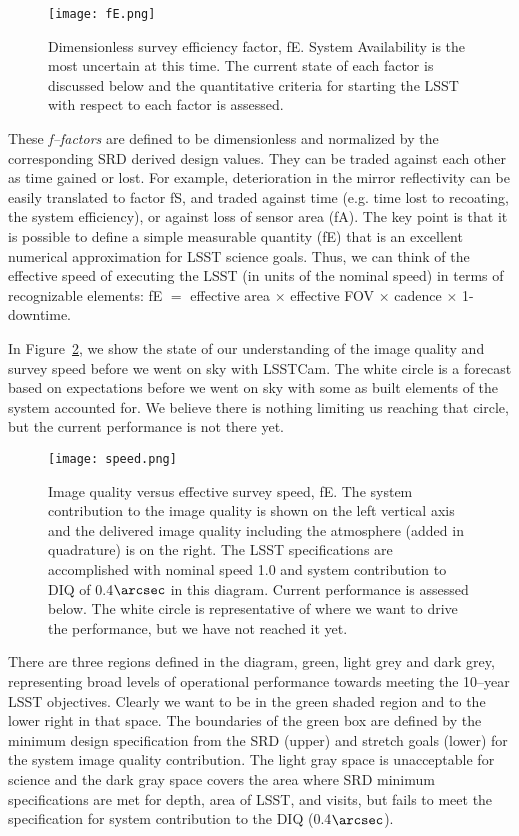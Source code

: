 \begin{figure}%
\centering
\texttt{[image: fE.png]}
\caption{Dimensionless survey efficiency factor, fE. System Availability is the most uncertain at this time. The current state of each factor is discussed below and the quantitative criteria for starting the LSST with respect to each factor is assessed.}
\label{fE}
\end{figure}

These {\it f--factors} are defined to be dimensionless and normalized by the corresponding SRD derived design values. They can be traded against each other as time gained or lost.  For example, deterioration in the mirror reflectivity can be easily translated to factor fS, and traded against time (e.g. time lost to recoating, the system efficiency), or against loss of sensor area (fA).
The key point is that it is possible to define a simple measurable quantity (fE) that is an excellent numerical approximation for LSST science goals. Thus, we can think of the effective speed of executing the LSST (in units of the nominal speed) in terms of recognizable elements:  fE $=$ effective area $\times$ effective FOV $\times$ cadence $\times$ 1-downtime.

In Figure~\ref{speed}, we show the state of our understanding of the image quality and survey speed before we went on sky with LSSTCam. The white circle is a forecast based on expectations before we went on sky with some as built elements of the system accounted for. We believe there is nothing limiting us reaching that circle, but the current performance is not there yet. 

\begin{figure}[t]
\centering
\texttt{[image: speed.png]}
\caption{Image quality versus effective survey speed, fE. The system contribution to the image quality is shown on the left vertical axis and the delivered image quality including the atmosphere (added in quadrature) is on the right. The LSST specifications are  accomplished with nominal speed 1.0 and system contribution to DIQ of 0.4$\arcsec$ in this diagram. Current performance is assessed below. The white circle is representative of where we want to drive the performance, but we have not reached it yet.}
\label{speed}
\end{figure}

There are three regions defined in the diagram, green, light grey and dark grey, representing broad levels of operational performance towards meeting the 10--year LSST objectives. Clearly we want to be in the green shaded region and to the lower right in that space. The boundaries of the green box are defined by the minimum design specification from the SRD (upper) and stretch goals (lower) for the system image quality contribution.  The light gray space is unacceptable for science and the dark gray space covers the area where SRD minimum specifications are met for depth, area of LSST, and visits, but fails to meet the specification for system contribution to the DIQ (0.4$\arcsec$). 

